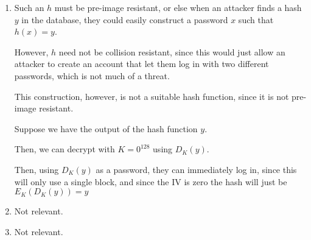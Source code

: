 


\begin{enumerate}[label=(\alph*)]

  \item
    Such an $h$ must be pre-image resistant, or else when an attacker finds a hash $y$ in the database, they could easily construct a password $x$ such that $h(x) = y$.

    However, $h$ need not be collision resistant, since this would just allow an attacker to create an account that let them log in with two different passwords, which is not much of a threat.

    This construction, however, is not a suitable hash function, since it is not pre-image resistant.

    Suppose we have the output of the hash function $y$.

    Then, we can decrypt with $K=0^{128}$ using $D_K(y)$.

    Then, using $D_K(y)$ as a password, they can immediately log in, since this will only use a single block, and since the IV is zero the hash will just be $E_K(D_K(y)) = y$


  \item
    Not relevant.

  \item
    Not relevant.
        
    \end{enumerate}

